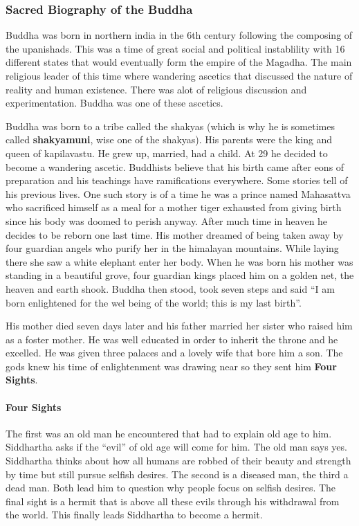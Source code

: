 \documentclass{article}
\begin{document}
\subsubsection{Sacred Biography of the Buddha}
\label{ssub:sacred_biography_of_the_buddha}
Buddha was born in northern india in the 6th century following the composing of the upanishads. This was a time of great social and political instablility with 16 different states that would eventually form the empire of the Magadha. The main religious leader of this time where wandering ascetics that discussed the nature of reality and human existence. There was alot of religious discussion and experimentation. Buddha was one of these ascetics.

Buddha was born to a tribe called the shakyas (which is why he is sometimes called \textbf{shakyamuni}, wise one of the shakyas). His parents were the king and queen of kapilavastu. He grew up, married, had a child. At 29 he decided to become a wandering ascetic. Buddhists believe that his birth came after eons of preparation and his teachings have ramifications everywhere. Some stories tell of his previous lives. One such story is of a time he was a prince named Mahasattva who sacrificed himself as a meal for a mother tiger exhausted from giving birth since his body was doomed to perish anyway. After much time in heaven he decides to be reborn one last time. His mother dreamed of being taken away by four guardian angels who purify her in the himalayan mountains. While laying there she saw a white elephant enter her body. When he was born his mother was standing in a beautiful grove, four guardian kings placed him on a golden net, the heaven and earth shook. Buddha then stood, took seven steps and said ``I am born enlightened for the wel being of the world; this is my last birth''.

His mother died seven days later and his father married her sister who raised him as a foster mother. He was well educated in order to inherit the throne and he excelled. He was given three palaces and a lovely wife that bore him a son. The gods knew his time of enlightenment was drawing near so they sent him \textbf{Four Sights}.

\paragraph{Four Sights}
The first was an old man he encountered that had to explain old age to him. Siddhartha asks if the ``evil'' of old age will come for him. The old man says yes. Siddhartha thinks about how all humans are robbed of their beauty and strength by time but still pursue selfish desires. The second is a diseased man, the third a dead man. Both lead him to question why people focus on selfish desires. The final sight is a hermit that is above all these evils through his withdrawal from the world. This finally leads Siddhartha to become a hermit.
\end{document}
